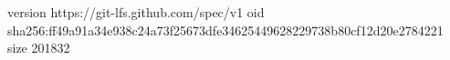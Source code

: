version https://git-lfs.github.com/spec/v1
oid sha256:ff49a91a34e938c24a73f25673dfe34625449628229738b80cf12d20e2784221
size 201832
